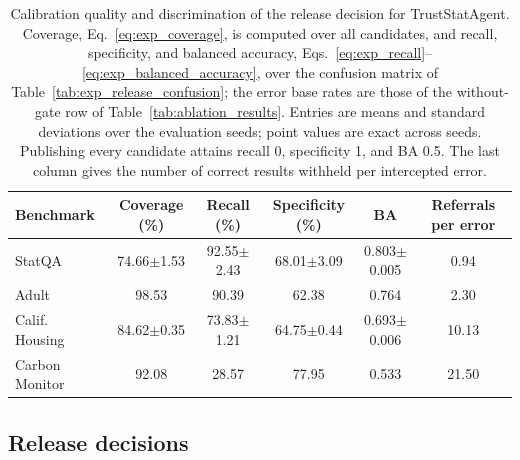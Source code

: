 \documentclass[preprint,12pt,authoryear]{elsarticle}
\begin{document}
\begin{table}[t]
\centering
\scriptsize
\caption{Calibration quality and discrimination of the release decision for TrustStatAgent. Coverage, Eq.~\eqref{eq:exp_coverage}, is computed over all candidates, and recall, specificity, and balanced accuracy, Eqs.~\eqref{eq:exp_recall}--\eqref{eq:exp_balanced_accuracy}, over the confusion matrix of Table~\ref{tab:exp_release_confusion}; the error base rates are those of the without-gate row of Table~\ref{tab:ablation_results}. Entries are means and standard deviations over the evaluation seeds; point values are exact across seeds. Publishing every candidate attains recall 0, specificity 1, and BA 0.5. The last column gives the number of correct results withheld per intercepted error.}
\label{tab:calibration_discrimination}
\setlength{\tabcolsep}{3pt}
\begin{tabularx}{\linewidth}{@{}lccccc@{}}
\toprule
\textbf{Benchmark} & \textbf{Coverage (\%)} & \textbf{Recall (\%)} & \textbf{Specificity (\%)} & \textbf{BA} & \textbf{Referrals per error}\\
\midrule
StatQA & 74.66$\pm$1.53 & 92.55$\pm$2.43 & 68.01$\pm$3.09 & 0.803$\pm$0.005 & 0.94\\
Adult & 98.53 & 90.39 & 62.38 & 0.764 & 2.30\\
Calif. Housing & 84.62$\pm$0.35 & 73.83$\pm$1.21 & 64.75$\pm$0.44 & 0.693$\pm$0.006 & 10.13\\
Carbon Monitor & 92.08 & 28.57 & 77.95 & 0.533 & 21.50\\
\bottomrule
\end{tabularx}
\end{table}

\subsection{Release decisions}
\label{sec:results_release}
\end{document}
